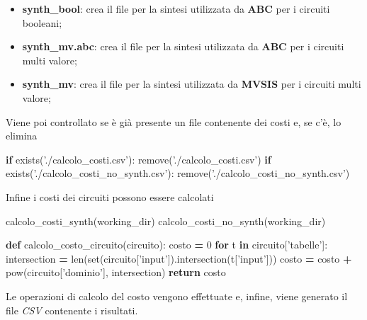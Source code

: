 \documentclass[]{book}
\newenvironment{Shaded}{\begin{snugshade}}{\end{snugshade}}
\newcommand{\BuiltInTok}[1]{#1}
\newcommand{\ControlFlowTok}[1]{\textcolor[rgb]{0.13,0.29,0.53}{\textbf{#1}}}
\newcommand{\DecValTok}[1]{\textcolor[rgb]{0.00,0.00,0.81}{#1}}
\newcommand{\KeywordTok}[1]{\textcolor[rgb]{0.13,0.29,0.53}{\textbf{#1}}}
\newcommand{\NormalTok}[1]{#1}
\newcommand{\OperatorTok}[1]{\textcolor[rgb]{0.81,0.36,0.00}{\textbf{#1}}}
\newcommand{\StringTok}[1]{\textcolor[rgb]{0.31,0.60,0.02}{#1}}
\providecommand{\tightlist}{%
  \setlength{\itemsep}{0pt}\setlength{\parskip}{0pt}}
\begin{document}
\begin{itemize}
\tightlist
\item
  \textbf{synth\_bool}: crea il file per la sintesi utilizzata da \textbf{ABC} per i circuiti booleani;
\item
  \textbf{synth\_mv.abc}: crea il file per la sintesi utilizzata da \textbf{ABC} per i circuiti multi valore;
\item
  \textbf{synth\_mv}: crea il file per la sintesi utilizzata da \textbf{MVSIS} per i circuiti multi valore;
\end{itemize}

\newpage

Viene poi controllato se è già presente un file contenente dei costi e, se c'è, lo elimina

\begin{Shaded}
\begin{Highlighting}[]
\ControlFlowTok{if}\NormalTok{ exists(}\StringTok{'./calcolo_costi.csv'}\NormalTok{):}
\NormalTok{    remove(}\StringTok{'./calcolo_costi.csv'}\NormalTok{)}
\ControlFlowTok{if}\NormalTok{ exists(}\StringTok{'./calcolo_costi_no_synth.csv'}\NormalTok{):}
\NormalTok{    remove(}\StringTok{'./calcolo_costi_no_synth.csv'}\NormalTok{)}
\end{Highlighting}
\end{Shaded}

Infine i costi dei circuiti possono essere calcolati

\begin{Shaded}
\begin{Highlighting}[]
\NormalTok{calcolo_costi_synth(working_dir)}
\NormalTok{calcolo_costi_no_synth(working_dir)}

\KeywordTok{def}\NormalTok{ calcolo_costo_circuito(circuito):}
\NormalTok{  costo }\OperatorTok{=} \DecValTok{0}
  \ControlFlowTok{for}\NormalTok{ t }\KeywordTok{in}\NormalTok{ circuito[}\StringTok{'tabelle'}\NormalTok{]:}
\NormalTok{    intersection }\OperatorTok{=} \BuiltInTok{len}\NormalTok{(}\BuiltInTok{set}\NormalTok{(circuito[}\StringTok{'input'}\NormalTok{]).intersection(t[}\StringTok{'input'}\NormalTok{]))}
\NormalTok{    costo }\OperatorTok{=}\NormalTok{ costo }\OperatorTok{+} \BuiltInTok{pow}\NormalTok{(circuito[}\StringTok{'dominio'}\NormalTok{], intersection)}
  \ControlFlowTok{return}\NormalTok{ costo}
\end{Highlighting}
\end{Shaded}

Le operazioni di calcolo del costo vengono effettuate e, infine, viene generato il file \emph{CSV} contenente i risultati.
\end{document}
